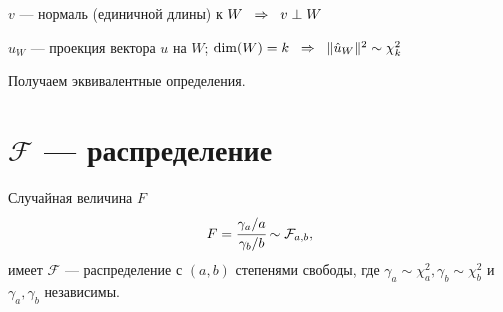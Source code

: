 \documentclass[12pt]{article} %
\theoremstyle{definition} %
\def \hu{\hat{u}}
\def \cF{\mathcal{F}}
\def \cChi{\mathcal{\chi}}
\begin{document}
   

 $v$ — нормаль (единичной длины) к $W \hspace{0.2cm} \Rightarrow \hspace{0.2cm} v \perp W$ \par
 $\hu_W$ — проекция вектора $u$ на $W$;   $\dim(W) = k \hspace{0.2cm} \Rightarrow \hspace{0.2cm} \lVert \hu_W \rVert ^2 \sim \cChi_k^2 \hspace{0.2cm}$ \par
 Получаем эквивалентные определения.

\section{$\cF$ — распределение}
\begin{classic_def}\hspace{2cm} \par
    \smallskip
    Случайная величина $F$
    \[
        F = \cfrac{\gamma_a/a}{\gamma_b/b} \sim \cF_{a,b}, 
    \]
    имеет $\cF$ — распределение с $(a,b)$ степенями свободы, где $\gamma_a \sim \cChi_{a}^2, \gamma_b \sim \cChi_{b}^2$ и $\gamma_a, \gamma_b$ независимы.
    \end{classic_def}
\end{document}
